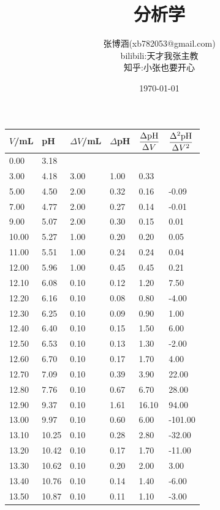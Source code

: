\documentclass[UTF8,AutoFakeBold]{ctexbook}
\title{\kaishu\textbf {分析学}}
\author{\kaishu 张博涵(xb782053@gmail.com)\\
\kaishu bilibili:天才我张主教\\
\kaishu 知乎:小张也要开心}
\date{\kaishu \today}
\begin{document}
\begin{table}
    \centering
     \begin{tabular}{p{2cm}<{\centering} p{2cm}<{\centering} p{2cm}<{\centering} p{2cm}<{\centering} p{2cm}<{\centering} p{2cm}<{\centering}}
		\toprule
        $V$/mL & pH & $\Delta V$/mL & $\Delta$pH & $\dfrac{\Delta \ce{pH}}{\Delta V}$ & $\dfrac{\Delta^{2} \ce{pH}}{\Delta V^{2}}$ \\
        \midrule
        0.00 & 3.18 &  &  &  &  \\ 
        3.00 & 4.18 & 3.00 & 1.00 & 0.33 &  \\ 
        5.00 & 4.50 & 2.00 & 0.32 & 0.16 & -0.09  \\ 
        7.00 & 4.77 & 2.00 & 0.27 & 0.14 & -0.01  \\ 
        9.00 & 5.07 & 2.00 & 0.30 & 0.15 & 0.01  \\
        10.00 & 5.27 & 1.00 & 0.20 & 0.20 & 0.05  \\
        11.00 & 5.51 & 1.00 & 0.24 & 0.24 & 0.04  \\ 
        12.00 & 5.96 & 1.00 & 0.45 & 0.45 & 0.21  \\ 
        12.10 & 6.08 & 0.10 & 0.12 & 1.20 & 7.50  \\ 
        12.20 & 6.16 & 0.10 & 0.08 & 0.80 & -4.00  \\ 
        12.30 & 6.25 & 0.10 & 0.09 & 0.90 & 1.00  \\ 
        12.40 & 6.40 & 0.10 & 0.15 & 1.50 & 6.00  \\ 
        12.50 & 6.53 & 0.10 & 0.13 & 1.30 & -2.00  \\ 
        12.60 & 6.70 & 0.10 & 0.17 & 1.70 & 4.00  \\
        12.70 & 7.09 & 0.10 & 0.39 & 3.90 & 22.00  \\
        12.80 & 7.76 & 0.10 & 0.67 & 6.70 & 28.00  \\
        12.90 & 9.37 & 0.10 & 1.61 & 16.10 & 94.00  \\ 
        13.00 & 9.97 & 0.10 & 0.60 & 6.00 & -101.00  \\ 
        13.10 & 10.25 & 0.10 & 0.28 & 2.80 & -32.00  \\ 
        13.20 & 10.42 & 0.10 & 0.17 & 1.70 & -11.00  \\
        13.30 & 10.62 & 0.10 & 0.20 & 2.00 & 3.00  \\ 
        13.40 & 10.76 & 0.10 & 0.14 & 1.40 & -6.00  \\ 
        13.50 & 10.87 & 0.10 & 0.11 & 1.10 & -3.00  \\ 

\end{tabular}
\end{table}
\end{document}
